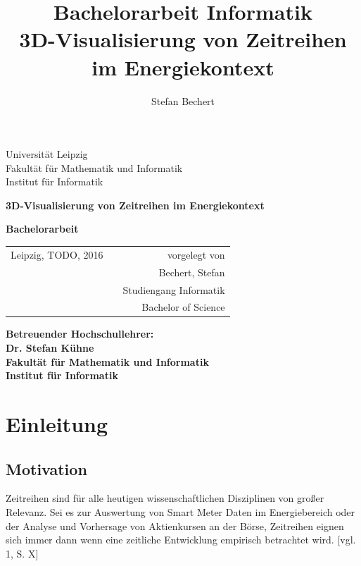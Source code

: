 \documentclass[12pt]{article}
\title{Bachelorarbeit Informatik\\ 3D-Visualisierung von Zeitreihen im
Energiekontext}
\author{Stefan Bechert}
\begin{document}
\thispagestyle{empty}
\begin{center}
	\begin{bfseries}
		Universität Leipzig\\
		Fakultät für Mathematik und Informatik\\
		Institut für Informatik
	\end{bfseries}
\end{center}
\vspace{4cm}
\begin{center}
 	\large{\textbf{3D-Visualisierung von Zeitreihen im Energiekontext}}
\end{center}
\vspace{3cm}
\begin{center}
	\LARGE{\textbf{Bachelorarbeit}}
\end{center}
\vspace{5cm}
\begin{tabular}{lp{18em}r}
	Leipzig, TODO, 2016 && vorgelegt von \\[0.4cm]
	&& Bechert, Stefan\\
	&& Studiengang Informatik \\
	&& Bachelor of Science
\end{tabular}

\vspace{2cm}
\begin{flushleft}
	\textbf{Betreuender Hochschullehrer: \\Dr. Stefan Kühne\\Fakultät für
	Mathematik und Informatik\\Institut für Informatik}
\end{flushleft}

\newpage
\thispagestyle{empty}
\tableofcontents \newpage

\section{Einleitung}
\thispagestyle{empty}
	\subsection{Motivation}
Zeitreihen sind für alle heutigen wissenschaftlichen Disziplinen von großer
Relevanz. Sei es zur Auswertung von Smart Meter Daten im Energiebereich oder der
Analyse und Vorhersage von Aktienkursen an der Börse, Zeitreihen eignen sich
immer dann wenn eine zeitliche Entwicklung empirisch betrachtet wird.
[vgl. 1, S. X]\\[0.4cm]
		
\end{document}
